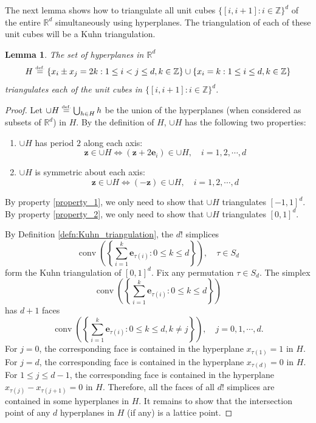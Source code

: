 \documentclass{article}
\numberwithin{equation}{section}
\newtheorem{lemma}{Lemma}[section]
\theoremstyle{definition}
\newcommand{\eqdef}{\ensuremath{\stackrel{\mbox{\upshape\tiny def.}}{=}}}
\begin{document}
The next lemma shows how to triangulate all unit cubes $\{[i,i+1]: i\in\mathbb{Z}\}^d$ of the entire $\mathbb{R}^{d}$ simultaneously using hyperplanes. The triangulation of each of these unit cubes will be a Kuhn triangulation.

\begin{lemma}
\label{lem:triangulation_of_Rd}
    The set of hyperplanes in $\mathbb{R}^{d}$
    $$H \eqdef \{ x_i \pm x_j = 2k: 1\le i<j \le d, k\in\mathbb{Z} \}
    \cup
    \{ x_i = k: 1\le i \le d, k\in\mathbb{Z} \}$$
    triangulates each of the unit cubes in $\{[i,i+1]: i\in\mathbb{Z}\}^d$.
\end{lemma}

\begin{proof}
Let $\cup H \eqdef \bigcup_{h\in H} h$ be the union of the hyperplanes (when considered as subsets of $\mathbb{R}^d$) in $H$. By the definition of $H$, $\cup H$ has the following two properties:
\begin{enumerate}
    \item \label{property_1} $\cup H$ has period $2$ along each axis:
    $$\mathbf{z} \in \cup H \Longleftrightarrow
      (\mathbf{z} + 2\mathbf{e}_i) \in \cup H, 
      \quad i=1,2,\cdots,d$$
    \item \label{property_2} $\cup H$ is symmetric about each axis:
    $$\mathbf{z} \in \cup H \Longleftrightarrow
      (- \mathbf{z}) \in \cup H,
      \quad i=1,2,\cdots,d$$
\end{enumerate}
By property \ref{property_1}, we only need to show that $\cup H$ triangulates $[-1,1]^d$. By property \ref{property_2}, we only need to show that $\cup H$ triangulates $[0,1]^d$. 

By Definition \ref{defn:Kuhn_triangulation}, the $d!$ simplices
\begin{equation}
    \operatorname{conv}\left(\left\{
    \sum_{i=1}^k \mathbf{e}_{\tau(i)}: 0 \le k \le d
    \right\}\right),
    \quad \tau\in S_d
\end{equation}
form the Kuhn triangulation of $[0,1]^d$. Fix any permutation $\tau\in S_d$. The simplex 
\[
    \operatorname{conv}\left(\left\{
    \sum_{i=1}^k \mathbf{e}_{\tau(i)}: 0 \le k \le d
    \right\}\right)
\]
has $d+1$ faces
$$\operatorname{conv}
\left(
    \left\{
        \sum_{i=1}^k \mathbf{e}_{\tau(i)}: 0 \le k \le d, k \ne j
    \right\}
\right),
\quad j=0,1,\cdots,d.$$
For $j=0$, the corresponding face is contained in the hyperplane $x_{\tau(1)}=1$ in $H$. For $j=d$, the corresponding face is contained in the hyperplane $x_{\tau(d)}=0$ in $H$. For $1\le j\le d-1$, the corresponding face is contained in the hyperplane $x_{\tau(j)} - x_{\tau(j+1)}=0$ in $H$. Therefore, all the faces of all $d!$ simplices are contained in some hyperplanes in $H$. It remains to show that the intersection point of any $d$ hyperplanes in $H$ (if any) is a lattice point.


\end{proof}
\end{document}
